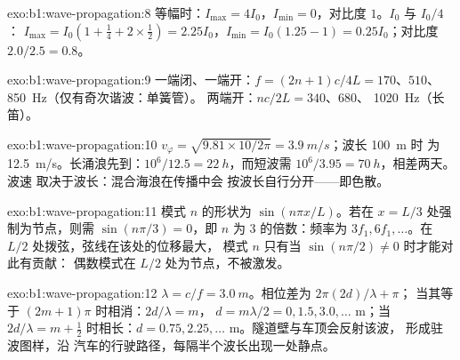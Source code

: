 \begin{solution}{exo:b1:wave-propagation:8}
等幅时：$I_{\max} = 4I_0$，$I_{\min} = 0$，对比度 $1$。$I_0$ 与 $I_0/4$：
$I_{\max} = I_0(1 + \tfrac14 + 2 \times \tfrac12) = 2.25I_0$，$I_{\min} =
I_0(1.25 - 1) = 0.25I_0$；对比度 $2.0/2.5 = 0.8$。
\end{solution}

\begin{solution}{exo:b1:wave-propagation:9}
一端闭、一端开：$f = (2n + 1)c/4L = 170$、$510$、\qty{850}{Hz}（仅有奇次谐波：单簧管）。
两端开：$nc/2L = 340$、$680$、
\qty{1020}{Hz}（长笛）。
\end{solution}

\begin{solution}{exo:b1:wave-propagation:10}
$v_\varphi = \sqrt{9.81 \times 10/2\pi} = \qty{3.9}{m/s}$；波长 \qty{100}{m} 时
为 \qty{12.5}{m/s}。长涌浪先到：$10^6/12.5 =
\qty{22}{h}$，而短波需 $10^6/3.95 = \qty{70}{h}$，相差两天。波速
取决于波长：混合海浪在传播中会
按波长自行分开——即色散。
\end{solution}

\begin{solution}{exo:b1:wave-propagation:11}
模式 $n$ 的形状为 $\sin(n\pi x/L)$。若在 $x = L/3$ 处强制为节点，则需
$\sin(n\pi/3) = 0$，即 $n$ 为 $3$ 的倍数：频率为 $3f_1,
6f_1, \dots$。在 $L/2$ 处拨弦，弦线在该处的位移最大，
模式 $n$ 只有当 $\sin(n\pi/2) \neq 0$ 时才能对此有贡献：
偶数模式在 $L/2$ 处为节点，不被激发。
\end{solution}

\begin{solution}{exo:b1:wave-propagation:12}
$\lambda = c/f = \qty{3.0}{m}$。相位差为 $2\pi(2d)/\lambda + \pi$；
当其等于 $(2m + 1)\pi$ 时相消：$2d/\lambda = m$，
$d = m\lambda/2 = 0, 1.5, 3.0, \dots$ m；当 $2d/\lambda =
m + \tfrac12$ 时相长：$d = 0.75, 2.25, \dots$ m。隧道壁与车顶会反射该波，
形成驻波图样，沿
汽车的行驶路径，每隔半个波长出现一处静点。
\end{solution}


